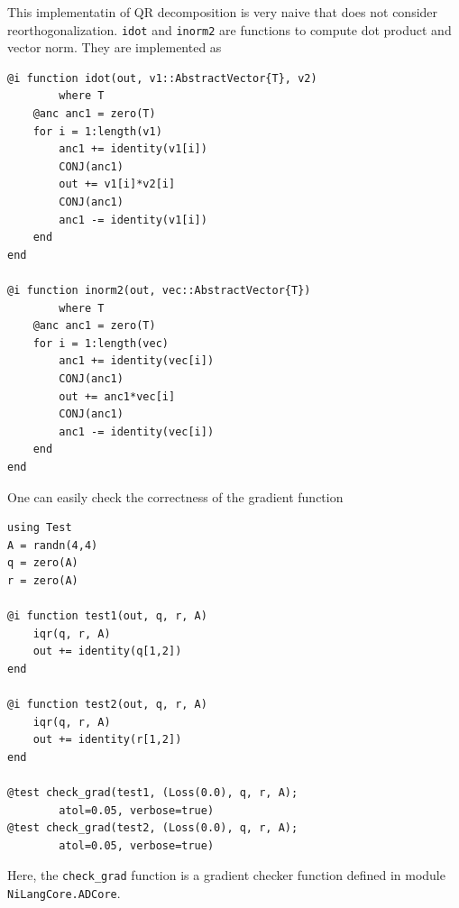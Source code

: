 \documentclass[aps,twocolumn,longbibliography,english,superscriptaddress]{revtex4-1}
\newcommand{\<}{\langle}
\renewcommand{\>}{\rangle}
\theoremstyle{definition}\newtheorem{definition}{\textit{Definition}}
\begin{document}
This implementatin of QR decomposition is very naive that does not consider reorthogonalization.
\texttt{idot} and \texttt{inorm2} are functions to compute dot product and vector norm.
They are implemented as

\begin{minipage}{.44\textwidth}
\begin{lstlisting}
@i function idot(out, v1::AbstractVector{T}, v2)
        where T
    @anc anc1 = zero(T)
    for i = 1:length(v1)
        anc1 += identity(v1[i])
        CONJ(anc1)
        out += v1[i]*v2[i]
        CONJ(anc1)
        anc1 -= identity(v1[i])
    end
end

@i function inorm2(out, vec::AbstractVector{T})
        where T
    @anc anc1 = zero(T)
    for i = 1:length(vec)
        anc1 += identity(vec[i])
        CONJ(anc1)
        out += anc1*vec[i]
        CONJ(anc1)
        anc1 -= identity(vec[i])
    end
end
\end{lstlisting}
\end{minipage}

One can easily check the correctness of the gradient function

\begin{minipage}{.44\textwidth}
\begin{lstlisting}
using Test
A = randn(4,4)
q = zero(A)
r = zero(A)

@i function test1(out, q, r, A)
    iqr(q, r, A)
    out += identity(q[1,2])
end

@i function test2(out, q, r, A)
    iqr(q, r, A)
    out += identity(r[1,2])
end

@test check_grad(test1, (Loss(0.0), q, r, A);
        atol=0.05, verbose=true)
@test check_grad(test2, (Loss(0.0), q, r, A);
        atol=0.05, verbose=true)
\end{lstlisting}
\end{minipage}

Here, the \texttt{check\_grad} function is a gradient checker function defined in module \texttt{NiLangCore.ADCore}.
\end{document}
